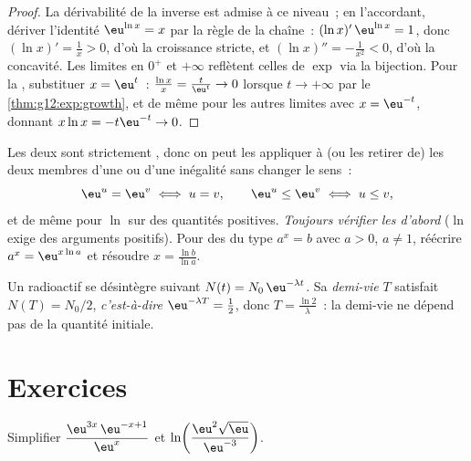 \begin{proof}
La dérivabilité de la  inverse est admise à ce niveau~; en l'accordant,
dériver l'identité $\eu^{\ln x} = x$ par la règle de la chaîne~:
$(\ln x)'\,\eu^{\ln x} = 1$, donc $(\ln x)' = \frac{1}{x} > 0$, d'où la
croissance stricte, et $(\ln x)'' = -\frac1{x^2} < 0$, d'où la concavité.
Les limites en $0^+$ et $+\infty$ reflètent celles de $\exp$ via la
bijection. Pour la , substituer $x = \eu^{t}$~:
$\frac{\ln x}{x} = \frac{t}{\eu^t} \to 0$ lorsque $t \to +\infty$ par le
\cref{thm:g12:exp:growth}, et de même pour les autres limites avec
$x = \eu^{-t}$, donnant $x\ln x = -t\eu^{-t} \to 0$.
\end{proof}

\begin{method}\label{met:g12:exp:equations}
Les deux  sont strictement , donc on peut les appliquer
à (ou les retirer de) les deux membres d'une  ou d'une inégalité
sans changer le sens~:
\[
\eu^{u} = \eu^{v} \iff u = v, \qquad
\eu^{u} \leq \eu^{v} \iff u \leq v,
\]
et de même pour $\ln$ sur des quantités positives. \emph{Toujours vérifier
les  d'abord} ($\ln$ exige des arguments positifs).
Pour des  du type $a^x = b$ avec $a>0$, $a \neq 1$, réécrire
$a^x = \eu^{x\ln a}$ et résoudre $x = \frac{\ln b}{\ln a}$.
\end{method}

\begin{example}\label{ex:g12:exp:halflife}
Un  radioactif se désintègre suivant $N(t) = N_0\,\eu^{-\lambda t}$.
Sa \emph{demi-vie} $T$ satisfait $N(T) = N_0/2$, \emph{c'est-à-dire}
$\eu^{-\lambda T} = \frac12$, donc $T = \frac{\ln 2}{\lambda}$~: la demi-vie
ne dépend pas de la quantité initiale.
\end{example}

\section{Exercices}

\begin{exercise}[$\star$]\label{exo:g12:exp:1}
Simplifier
$\dfrac{\eu^{3x}\,\eu^{-x+1}}{\eu^{x}}$ et
$\ln\!\left(\dfrac{\eu^2\sqrt{\eu}}{\eu^{-3}}\right)$.
\end{exercise}

